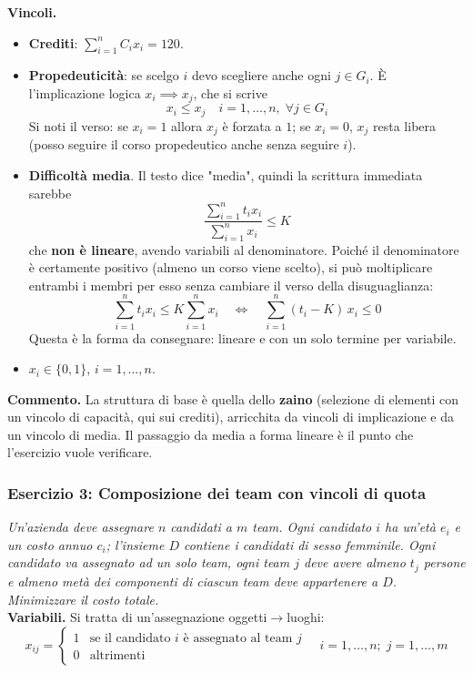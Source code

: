 \documentclass[12pt]{extarticle} %
\begin{document}
\noindent\textbf{Vincoli.}
\begin{itemize}
    \item \textbf{Crediti}: $\displaystyle\sum_{i=1}^n C_i x_i = 120$.
    \item \textbf{Propedeuticità}: se scelgo $i$ devo scegliere anche ogni $j \in G_i$. È l'implicazione logica $x_i \implies x_j$, che si scrive
    \[
    x_i \le x_j \quad i=1,\dots,n, \; \forall j \in G_i
    \]
    Si noti il verso: se $x_i=1$ allora $x_j$ è forzata a $1$; se $x_i=0$, $x_j$ resta libera (posso seguire il corso propedeutico anche senza seguire $i$).
    \item \textbf{Difficoltà media}. Il testo dice "media", quindi la scrittura immediata sarebbe
    \[
    \frac{\sum_{i=1}^n t_i x_i}{\sum_{i=1}^n x_i} \le K
    \]
    che \textbf{non è lineare}, avendo variabili al denominatore. Poiché il denominatore è certamente positivo (almeno un corso viene scelto), si può moltiplicare entrambi i membri per esso senza cambiare il verso della disuguaglianza:
    \[
    \sum_{i=1}^n t_i x_i \le K \sum_{i=1}^n x_i \quad\Longleftrightarrow\quad \sum_{i=1}^n (t_i - K)\, x_i \le 0
    \]
    Questa è la forma da consegnare: lineare e con un solo termine per variabile.
    \item $x_i \in \{0,1\}$, $i=1,\dots,n$.
\end{itemize}

\noindent\textbf{Commento.} La struttura di base è quella dello \textbf{zaino} (selezione di elementi con un vincolo di capacità, qui sui crediti), arricchita da vincoli di implicazione e da un vincolo di media. Il passaggio da media a forma lineare è il punto che l'esercizio vuole verificare.

\subsubsection{Esercizio 3: Composizione dei team con vincoli di quota}
\textit{Un'azienda deve assegnare $n$ candidati a $m$ team. Ogni candidato $i$ ha un'età $e_i$ e un costo annuo $c_i$; l'insieme $D$ contiene i candidati di sesso femminile. Ogni candidato va assegnato ad un solo team, ogni team $j$ deve avere almeno $t_j$ persone e almeno metà dei componenti di ciascun team deve appartenere a $D$. Minimizzare il costo totale.}\\

\noindent\textbf{Variabili.} Si tratta di un'assegnazione oggetti$\to$luoghi:
\[
x_{ij} = \begin{cases} 1 & \text{se il candidato } i \text{ è assegnato al team } j\\ 0 & \text{altrimenti}\end{cases} \quad i=1,\dots,n; \; j=1,\dots,m
\]
\end{document}
